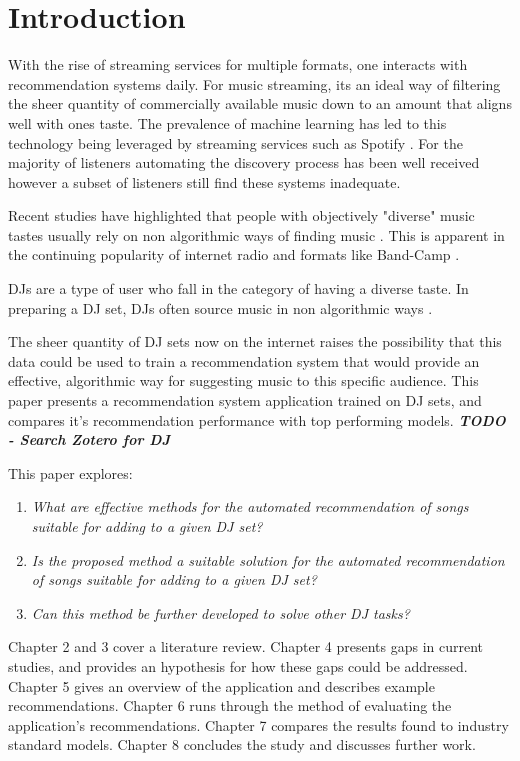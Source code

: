 
\graphicspath{{Chapter1/}}


\chapter{Introduction}
With the rise of streaming services for multiple formats, one interacts with recommendation systems daily. For music streaming, its an ideal way of filtering the sheer quantity of commercially available music down to an amount that aligns well with ones taste. The prevalence of machine learning has led to this technology being leveraged by streaming services such as Spotify \citep{httpsresearchatspotifycommachine-learning_machine_2023}. For the majority of listeners automating the discovery process has been well received however a subset of listeners still find these systems inadequate.

Recent studies have highlighted that people with objectively "diverse" music tastes usually rely on non algorithmic ways of finding music \citep{anderson_algorithmic_2020}. This is apparent in the continuing popularity of internet radio and formats like Band-Camp \citep{market_research_future_internet_2022} \citep{roberts_anti-spotify_2020}. 

DJs are a type of user who fall in the category of having a diverse taste. In preparing a DJ set, DJs often source music in non algorithmic ways \citep{allen_djs_2021}.

 The sheer quantity of DJ sets now on the internet raises the possibility that this data could be used to train a recommendation system that would provide an effective, algorithmic way for suggesting music to this specific audience. This paper presents a recommendation system application trained on DJ sets, and compares it's recommendation performance with top performing models. \textbf{\textit{TODO - Search Zotero for DJ}}

This paper explores:

\begin{enumerate}
	\item \textit{What are effective methods for the automated recommendation of songs suitable
		for adding to a given DJ set?}
	\item \textit{Is the proposed method a suitable solution for the automated recommendation of songs suitable for adding to a given DJ set?}
	\item \textit{Can this method be further developed to solve other DJ tasks?}
\end{enumerate}

Chapter 2 and 3 cover a literature review. Chapter 4 presents gaps in current studies, and provides an hypothesis for how these gaps could be addressed. Chapter 5 gives an overview of the application and describes example recommendations. Chapter 6 runs through the method of evaluating the application's recommendations. Chapter 7 compares the results found to industry standard models. Chapter 8 concludes the study and discusses further work.
 
